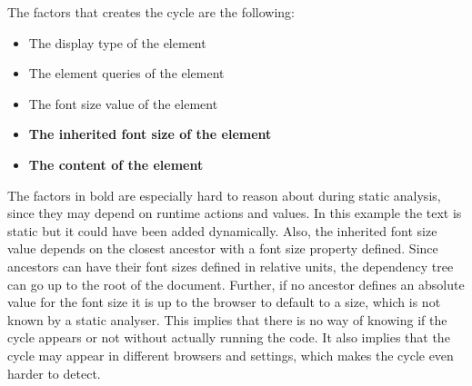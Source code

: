 \documentclass[a4paper,11pt]{kth-mag}
\newcommand{\code}[1]{\texttt{#1}}
\begin{document}
        The factors that creates the cycle are the following:
        \begin{itemize}
          \item The display type of the \gls{element}
          \item The \gls{element} queries of the \gls{element}
          \item The font size value of the \gls{element}
          \item \textbf{The inherited font size of the \gls{element}}
          \item \textbf{The content of the \gls{element}}
        \end{itemize}
        The factors in bold are especially hard to reason about during static analysis, since they may depend on runtime actions and values.
        In this example the text is static but it could have been added dynamically.
        Also, the inherited font size value depends on the closest ancestor with a font size property defined.
        Since ancestors can have their font sizes defined in relative units, the dependency tree can go up to the root of the \gls{document}.
        Further, if no ancestor defines an absolute value for the font size it is up to the \gls{browser} to default to a size, which is not known by a static analyser.
        This implies that there is no way of knowing if the cycle appears or not without actually running the code.
        It also implies that the cycle may appear in different \glspl{browser} and settings, which makes the cycle even harder to detect.

\end{document}
